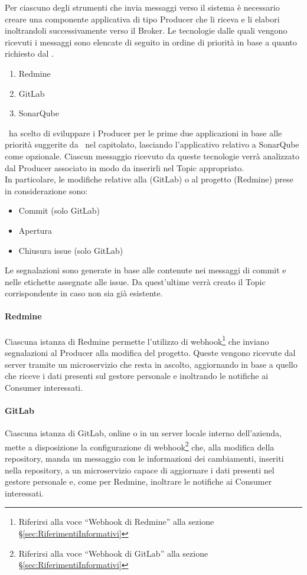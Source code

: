 		Per ciascuno degli strumenti che invia messaggi verso il sistema è necessario creare una componente applicativa di tipo Producer che li riceva e li elabori inoltrandoli successivamente verso il Broker.
		Le tecnologie dalle quali vengono ricevuti i messaggi sono elencate di seguito in ordine di priorità in base a quanto richiesto dal .
		\begin{enumerate}
			\item Redmine
			\item GitLab
			\item SonarQube
		\end{enumerate}
		\gruppo\ ha scelto di sviluppare i Producer per le prime due applicazioni in base alle priorità suggerite da \II\ nel capitolato, lasciando l'applicativo relativo a SonarQube come opzionale.
		Ciascun messaggio ricevuto da queste tecnologie verrà analizzato dal Producer associato in modo da inserirli nel Topic appropriato.\\
		In particolare, le modifiche relative alla  (GitLab) o al progetto (Redmine) prese in considerazione sono:
		\begin{itemize}
			\item Commit (solo GitLab)
			\item Apertura  
			\item Chiusura issue (solo GitLab)
		\end{itemize}
		Le segnalazioni sono generate in base alle  contenute nei messaggi di commit e nelle etichette assegnate alle issue.
		Da quest'ultime verrà creato il Topic corrispondente in caso non sia già esistente.
		
		\paragraph{Redmine}
		Ciascuna istanza di Redmine permette l'utilizzo di webhook\footnote{Riferirsi alla voce ``Webhook di Redmine'' alla sezione \S\ref{sec:RiferimentiInformativi}} che inviano segnalazioni al Producer alla modifica del progetto.
		Queste vengono ricevute dal server tramite un microservizio che resta in ascolto, aggiornando in base a quello che riceve i dati presenti sul gestore personale e inoltrando le notifiche ai Consumer interessati.
		
		\paragraph{GitLab}
		Ciascuna istanza di GitLab, online o in un server locale interno dell'azienda, mette a disposizione la configurazione di webhook\footnote{Riferirsi alla voce ``Webhook di GitLab'' alla sezione \S\ref{sec:RiferimentiInformativi}} che, alla modifica della repository, manda un messaggio con le informazioni dei cambiamenti, inseriti nella repository, a un microservizio capace di aggiornare i dati presenti nel gestore personale e, come per Redmine, inoltrare le notifiche ai Consumer interessati.
		
